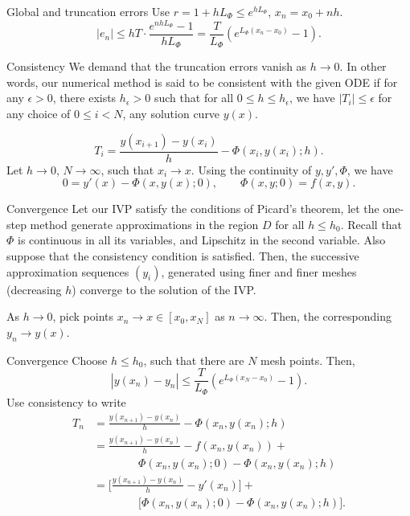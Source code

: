 \documentclass{beamer}
\begin{document}
    \begin{frame}{Global and truncation errors}
        Use $r = 1 + hL_\Phi \leq e^{hL_\Phi}$, $x_n = x_0 + nh$.
        \[
            |e_n| \leq hT\cdot \frac{e^{nhL_\Phi} - 1}{hL_\Phi} = 
            \frac{T}{L_\Phi}\left(e^{L_\Phi(x_n - x_0)} - 1\right).
        \] 
    \end{frame}

    \begin{frame}{Consistency}
        We demand that the truncation errors vanish as $h \to 0$. In other words, our
        numerical method is said to be consistent with the given ODE if for any
        $\epsilon > 0$, there exists $h_\epsilon > 0$ such that for all $0 \leq h
        \leq h_\epsilon$, we have $|T_i| \leq \epsilon$ for any choice of $0 \leq i <
        N$, any solution curve $y(x)$.

        \[
            T_i = \frac{y(x_{i + 1}) - y(x_i)}{h} - \Phi(x_i, y(x_i); h).
        \] Let $h \to 0$, $N \to \infty$, such that $x_i \to x$. Using the continuity
        of $y, y', \Phi$, we have \[
            0 = y'(x) - \Phi(x, y(x); 0), \qquad \Phi(x, y; 0) = f(x, y).
        \] 
    \end{frame}


    \begin{frame}{Convergence}
        Let our IVP satisfy the conditions of Picard's theorem, let the one-step
        method generate approximations in the region $D$ for all $h \leq h_0$. Recall
        that $\Phi$ is continuous in all its variables, and Lipschitz in the second
        variable. Also suppose that the consistency condition is satisfied. Then, the
        successive approximation sequences $(y_i)$, generated using finer and finer
        meshes (decreasing $h$) converge to the solution of the IVP.

        As $h \to 0$, pick points $x_n \to x \in [x_0, x_N]$ as $n \to \infty$. Then,
        the corresponding $y_n \to y(x)$.
    \end{frame}

    \begin{frame}{Convergence}
        Choose $h \leq h_0$, such that there are $N$ mesh points. Then, \[
            |y(x_n) - y_n| \leq \frac{T}{L_\Phi}\left(e^{L_\Phi(x_N - x_0)} - 1\right).
        \] Use consistency to write \begin{align*}
            T_n &= \frac{y(x_{n + 1}) - y(x_n)}{h} - \Phi(x_n, y(x_n); h) \\
            &= \frac{y(x_{n + 1}) - y(x_n)}{h} - f(x_n, y(x_n)) + \\
            & \qquad\qquad \Phi(x_n, y(x_n); 0) - \Phi(x_n, y(x_n); h) \\
            &= \Big[\frac{y(x_{n + 1}) - y(x_n)}{h} - y'(x_n)\Big] + \\
           & \qquad\qquad  \Big[\Phi(x_n, y(x_n); 0) - \Phi(x_n, y(x_n); h)\Big].
        \end{align*}
    \end{frame}
\end{document}
